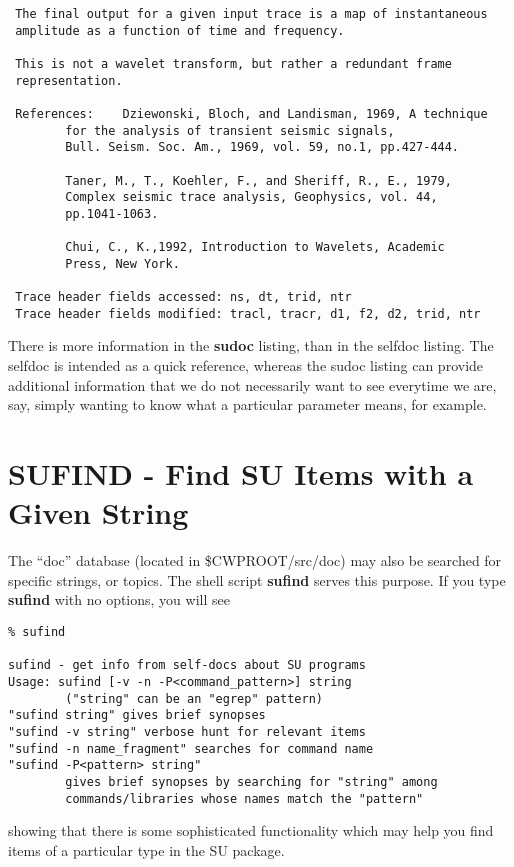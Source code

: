 {{{\begin{verbatim}
 The final output for a given input trace is a map of instantaneous
 amplitude as a function of time and frequency.

 This is not a wavelet transform, but rather a redundant frame
 representation.

 References: 	Dziewonski, Bloch, and Landisman, 1969, A technique
		for the analysis of transient seismic signals,
		Bull. Seism. Soc. Am., 1969, vol. 59, no.1, pp.427-444.

		Taner, M., T., Koehler, F., and Sheriff, R., E., 1979,
		Complex seismic trace analysis, Geophysics, vol. 44,
		pp.1041-1063.

 		Chui, C., K.,1992, Introduction to Wavelets, Academic
		Press, New York.

 Trace header fields accessed: ns, dt, trid, ntr
 Trace header fields modified: tracl, tracr, d1, f2, d2, trid, ntr

\end{verbatim}}\noindent

There is more information in the {\bf sudoc\/} listing,
than in the selfdoc listing. The selfdoc is intended as a quick reference,
whereas the sudoc listing can provide additional information
that we do not necessarily want to see everytime we are, say, simply wanting
to know what a particular parameter means, for example.
 
\section{SUFIND - Find SU Items with a Given String}

The ``doc'' database (located in \$CWPROOT/src/doc) may also be
searched for specific 
strings, or topics. The shell script {\bf sufind\/}
serves this purpose.
If you type {\bf sufind\/} with no options, you will see
{\small\begin{verbatim}
% sufind

sufind - get info from self-docs about SU programs
Usage: sufind [-v -n -P<command_pattern>] string
        ("string" can be an "egrep" pattern)
"sufind string" gives brief synopses
"sufind -v string" verbose hunt for relevant items
"sufind -n name_fragment" searches for command name
"sufind -P<pattern> string"
        gives brief synopses by searching for "string" among
        commands/libraries whose names match the "pattern"

\end{verbatim}}\noindent
showing that there is some sophisticated functionality
which may help you find items of a particular type in
the SU package.

}}
